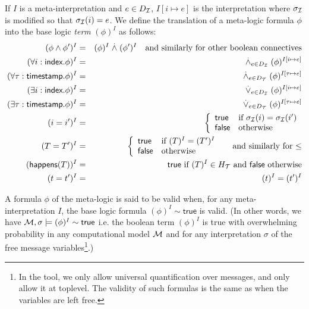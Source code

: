 \begin{definition}
  If $I$ is a meta-interpretation and $e\in D_{\mathcal{I}}$,
  $I[i\mapsto e]$ is the interpretation where $\sigma_{\mathcal{I}}$ is
  modified so that $\sigma_{\mathcal{I}}(i)=e$.
  We define the translation of a meta-logic formula $\phi$
  into the base logic \emph{term} $(\phi)^I$
  as follows:
  \begin{eqnarray*}
    (\phi\wedge\phi')^I &=& (\phi)^I \stackrel{.}{\wedge} (\phi')^I
    \quad \text{and similarly for other boolean connectives} \\
    (\forall i:\textsf{index}. \phi)^I &=&
    \stackrel{.}{\wedge}_{e\in D_{\mathcal{I}}} (\phi)^{I[i\mapsto e]} \\
    (\forall \tau:\textsf{timestamp}. \phi)^I &=&
    \stackrel{.}{\wedge}_{e\in D_{\mathcal{T}}} (\phi)^{I[\tau\mapsto e]} \\
    (\exists i:\textsf{index}. \phi)^I &=&
    \stackrel{.}{\vee}_{e\in D_{\mathcal{I}}} (\phi)^{I[i\mapsto e]} \\
    (\exists \tau:\textsf{timestamp}. \phi)^I &=&
    \stackrel{.}{\vee}_{e\in D_{\mathcal{T}}} (\phi)^{I[\tau\mapsto e]} \\
    (i=i')^I &=&
    \left\{\begin{array}{ll}
      \mathsf{true} & \text{if } \sigma_{\mathcal{I}}(i)=\sigma_{\mathcal{I}}(i') \\
      \mathsf{false} & \text{otherwise}
    \end{array}\right. \\
    (T = T')^I &=&
    \left\{\begin{array}{ll}
      \mathsf{true} & \text{if } (T)^I = (T')^I \\
      \mathsf{false} & \text{otherwise}
    \end{array}\right.
    \quad\text{ and similarly for $\leq$} \\
    (\textsf{happens}(T))^I &=& \mathsf{true}
    \text{ if } (T)^I \in H_{\mathcal{T}}
    \text{ and } \mathsf{false} \text{ otherwise}
    \\
    (t=t')^I &=& (t)^I = (t')^I
  \end{eqnarray*}
\end{definition}

\begin{definition}
  A formula $\phi$ of the meta-logic is said to be valid when,
  for any meta-interpretation $I$, the base logic formula
  $(\phi)^I \sim \mathsf{true}$ is valid.
  (In other words, we have $\mathcal{M},\sigma\models(\phi)^I\sim\mathsf{true}$
  i.e. the boolean term $(\phi)^I$ is true with overwhelming
  probability in any computational model $\mathcal{M}$ and for any interpretation
  $\sigma$ of the free message variables\footnote{
    In the tool, we only allow universal quantification over messages, and
  only allow it at toplevel. The validity of such formulas is the same as
  when the variables are left free.}.)
\end{definition}

